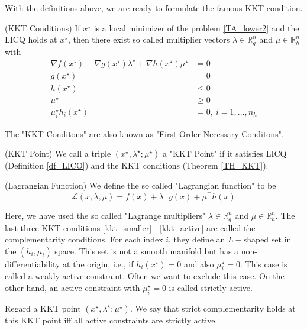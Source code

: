 	With the definitions above, we are ready to formulate the famous KKT condition. 
	\begin{theorem}(KKT Conditions)
		If $x^\star$ is a local minimizer of the problem \ref{TA_lower2} and the LICQ holds at $x^\star$, then there exist
		so called multiplier vectors $\lambda \in \mathbb{R}^n_g$ and $\mu \in \mathbb{R}^n_h$ with 
		\begin{subequations}
			\begin{align}
				\nabla f(x^\star) + \nabla g(x^\star) \lambda^\star +  \nabla h(x^\star) \mu^\star &= 0 \\
				g(x^\star)	 &= 0   \\
				h(x^\star)	&\leq 0  \label{kkt_smaller}\\
				\mu^\star & \geq 0 \\
				\mu_i^\star  h_i(x^\star) &=0 , \  i = 1, ..., n_h \label{kkt_active}
			\end{align}
		\end{subequations}
		\label{TH_KKT}
	\end{theorem}
	The "KKT Conditons" are also known as "First-Order Necessary Conditons". 
	
	\begin{definition}(KKT Point)
		We call a triple $(x^\star, \lambda^\star; \mu^\star)$ a "KKT Point" if it satisfies LICQ  (Definition \ref{df_LICO}) and the KKT conditions (Theorem \ref{TH_KKT}).
	\end{definition}
	\begin{definition}(Lagrangian Function)
		We define the so called "Lagrangian function" to be
		\begin{equation}
			\mathcal{L}(x,\lambda, \mu) = f(x) + \lambda^\top g(x) +  \mu^\top h(x) 
			\label{eq_Lagrangian}
		\end{equation}
	\end{definition}
	Here, we have used the so called "Lagrange multipliers" $\lambda \in \mathbb{R}^n_g$ and $\mu \in \mathbb{R}^n_h$. 
	The last three KKT conditions \ref{kkt_smaller} - \ref{kkt_active} are called the complementarity conditions. For each index $i$, they define an $L-$shaped set in the $(h_i, \mu_i)$ space. This set is not a smooth manifold but has a non-differentiability at the origin, i.e., if  $h_i(x^\star)=0$ and also $\mu_i^\star = 0$. This case is called a weakly active constraint. Often we want to exclude this case. On the other hand, an active constraint with $\mu_i^\star = 0$ is called strictly active.
	\begin{definition}
		Regard a KKT point $(x^\star, \lambda^\star; \mu^\star)$. We say that strict complementarity holds at this KKT point iff all	active constraints are strictly active.
	\end{definition}
	
